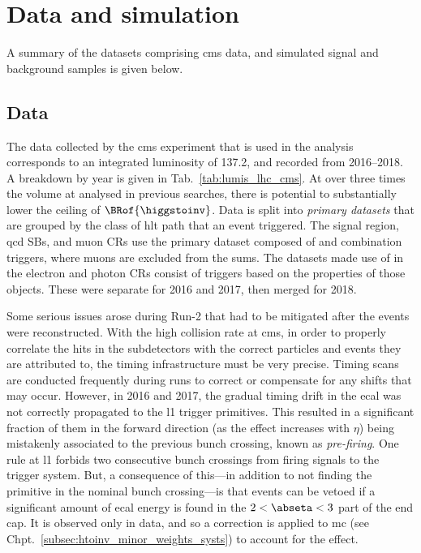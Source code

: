 \section{Data and simulation}
\label{sec:htoinv_data_sim}

A summary of the datasets comprising \acrshort{cms} data, and simulated signal and background samples is given below.




\subsection{Data}
\label{subsec:htoinv_data}

The data collected by the \acrshort{cms} experiment that is used in the analysis corresponds to an integrated luminosity of 137.2\fbinv, and recorded from 2016--2018. A breakdown by year is given in Tab.~\ref{tab:lumis_lhc_cms}. At over three times the volume at \comruntwo analysed in previous searches, there is potential to substantially lower the ceiling of $\BRof{\higgstoinv}$. Data is split into \emph{primary datasets} that are grouped by the class of \acrshort{hlt} path that an event triggered. The signal region, \acrshort{qcd} \glspl{SB}, and muon \glspl{CR} use the primary dataset composed of \ptmiss and \htmiss combination triggers, where muons are excluded from the sums. The datasets made use of in the electron and photon \glspl{CR} consist of triggers based on the properties of those objects. These were separate for 2016 and 2017, then merged for 2018.

Some serious issues arose during Run-2 that had to be mitigated after the events were reconstructed. With the high collision rate at \acrshort{cms}, in order to properly correlate the hits in the subdetectors with the correct particles and events they are attributed to, the timing infrastructure must be very precise. Timing scans are conducted frequently during runs to correct or compensate for any shifts that may occur. However, in 2016 and 2017, the gradual timing drift in the \acrshort{ecal} was not correctly propagated to the \acrlong{l1} trigger primitives. This resulted in a significant fraction of them in the forward direction (as the effect increases with $\eta$) being mistakenly associated to the previous bunch crossing, known as \emph{pre-firing}. One rule at \acrlong{l1} forbids two consecutive bunch crossings from firing signals to the trigger system. But, a consequence of this---in addition to not finding the primitive in the nominal bunch crossing---is that events can be vetoed if a significant amount of \acrshort{ecal} energy is found in the $\text{2} < \abseta < \text{3}$ part of the end cap. It is observed only in data, and so a correction is applied to \acrshort{mc} (see Chpt.~\ref{subsec:htoinv_minor_weights_systs}) to account for the effect.

